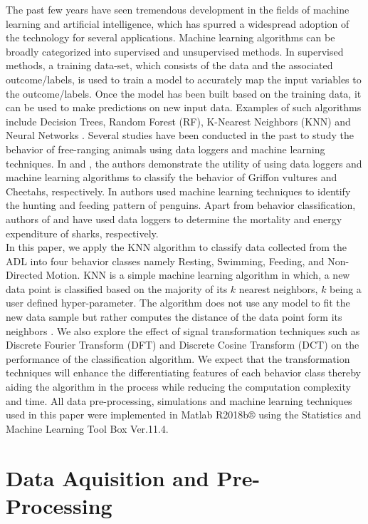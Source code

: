 \documentclass[conference]{IEEEtran}
\begin{document}
The past few years have seen tremendous development in the fields of machine learning and artificial intelligence, which has spurred a widespread adoption of the technology for several applications. Machine learning algorithms can be broadly categorized into supervised and unsupervised methods. In supervised methods, a training data-set, which consists of the data and the associated outcome/labels, is used to train a model to accurately map the input variables to the outcome/labels. Once the model has been built based on the training data, it can be used to make predictions on new input data. Examples of such algorithms include Decision Trees, Random Forest (RF), K-Nearest Neighbors (KNN) and Neural Networks \cite{1}. 
Several studies have been conducted in the past to study the behavior of free-ranging animals using data loggers and machine learning techniques. In  \cite{2} and  \cite{3}, the authors demonstrate the utility of using data loggers and machine learning algorithms to classify the behavior of Griffon vultures and Cheetahs, respectively. In  \cite{4} authors used machine learning techniques to identify the hunting and feeding pattern of penguins. Apart from behavior classification, authors of  \cite{5} and  \cite{6} have used data loggers to determine the mortality and energy expenditure of sharks, respectively. \\
\indent In this paper, we apply the KNN algorithm to classify data collected from the ADL into four behavior classes namely Resting, Swimming, Feeding, and Non-Directed Motion. KNN is a simple machine learning algorithm in which, a new data point is classified based on the majority of its $k$ nearest neighbors, $k$ being a user defined hyper-parameter. The algorithm does not use any model to fit the new data sample but rather computes the distance of the data point form its neighbors  \cite{7}. We also explore the effect of signal transformation techniques such as Discrete Fourier Transform (DFT) and Discrete Cosine Transform (DCT) on the performance of the classification algorithm. We expect that the transformation techniques will enhance the differentiating features of each behavior class thereby aiding the algorithm in the process while reducing the computation complexity and time. All data pre-processing, simulations and machine learning techniques used in this paper were implemented in Matlab R2018b® using the Statistics and Machine Learning Tool Box Ver.11.4.

\section{Data Aquisition and Pre-Processing}
\end{document}

